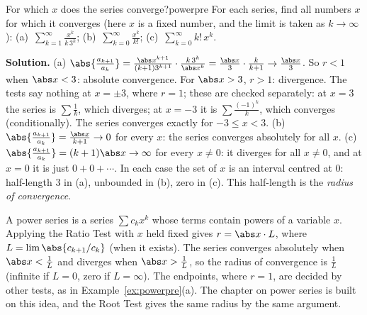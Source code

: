\documentclass[11pt]{article}
\begin{document}
\begin{exmp}{For which $x$ does the series converge?}{powerpre}
For each series, find all numbers $x$ for which it converges (here $x$ is a fixed number, and the limit is taken as $k\to\infty$): (a)~$\displaystyle\sum_{k=1}^\infty\frac{x^k}{k\,3^k}$; \quad (b)~$\displaystyle\sum_{k=0}^\infty\frac{x^k}{k!}$; \quad (c)~$\displaystyle\sum_{k=0}^\infty k!\,x^k$.

\textbf{Solution.} (a) $\abs{\frac{a_{k+1}}{a_k}}=\frac{\abs x^{k+1}}{(k+1)3^{k+1}}\cdot\frac{k\,3^k}{\abs x^k}=\frac{\abs x}3\cdot\frac k{k+1}\to\frac{\abs x}3$. So $r<1$ when $\abs x<3$: absolute convergence. For $\abs x>3$, $r>1$: divergence. The tests say nothing at $x=\pm3$, where $r=1$; these are checked separately: at $x=3$ the series is $\sum\frac1k$, which diverges; at $x=-3$ it is $\sum\frac{(-1)^k}k$, which converges (conditionally). The series converges exactly for $-3\le x<3$.
(b) $\abs{\frac{a_{k+1}}{a_k}}=\frac{\abs x}{k+1}\to0$ for every $x$: the series converges absolutely for all $x$. (c) $\abs{\frac{a_{k+1}}{a_k}}=(k+1)\abs x\to\infty$ for every $x\ne0$: it diverges for all $x\ne0$, and at $x=0$ it is just $0+0+\cdots$.
In each case the set of $x$ is an interval centred at $0$: half-length $3$ in (a), unbounded in (b), zero in (c). This half-length is the \emph{radius of convergence}.
\end{exmp}

\begin{remark}
A power series is a series $\sum c_kx^k$ whose terms contain powers of a variable $x$. Applying the Ratio Test with $x$ held fixed gives $r=\abs x\cdot L$, where $L=\lim\abs{c_{k+1}/c_k}$ (when it exists). The series converges absolutely when $\abs x<\frac1L$ and diverges when $\abs x>\frac1L$, so the radius of convergence is $\frac1L$ (infinite if $L=0$, zero if $L=\infty$). The endpoints, where $r=1$, are decided by other tests, as in Example~\ref{ex:powerpre}(a). The chapter on power series is built on this idea, and the Root Test gives the same radius by the same argument.
\end{remark}


\end{document}
